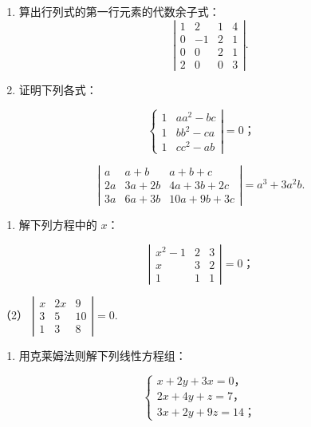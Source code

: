 \begin{enumerate}[start=5]
\item
  算出行列式的第一行元素的代数余子式：
\[
\left| \begin{array}{cccc} 1 & 2 & 1 & 4 \\ 0 & - 1 & 2 & 1 \\ 0 & 0 & 2 & 1 \\ 2 & 0 & 0 & 3 \end{array} \right|.
\]
\item
  证明下列各式：
\end{enumerate}

\[
\left\{ \begin{array}{ll} 1 & a a ^ {2} - b c \\ 1 & b b ^ {2} - c a \\ 1 & c c ^ {2} - a b \end{array} \right| = 0\text{；} \tag {1}
\]

\[
\left| \begin{array}{ccc} a & a + b & a + b + c \\ 2 a & 3 a + 2 b & 4 a + 3 b + 2 c \\ 3 a & 6 a + 3 b & 10 a + 9 b + 3 c \end{array} \right| = a ^ {3} + 3 a ^ {2} b. \tag {2}
\]

\begin{enumerate}[start=7]
\item
  解下列方程中的 \(x\)：
\end{enumerate}

\[
\left| \begin{array}{ccc} x ^ {2} - 1 & 2 & 3 \\ x & 3 & 2 \\ 1 & 1 & 1 \end{array} \right| = 0\text{；} \tag {1}
\]

（2）
\(\left| \begin{array}{ccc}x & 2x & 9\\ 3 & 5 & 10\\ 1 & 3 & 8 \end{array} \right| = 0.\)

\begin{enumerate}[start=8]
\item
  用克莱姆法则解下列线性方程组：
\end{enumerate}

\[
\left\{ \begin{array}{l} x + 2 y + 3 x = 0\text{，} \\ 2 x + 4 y + z = 7\text{，} \\ 3 x + 2 y + 9 z = 14\text{；} \end{array} \right. \tag {1}
\]

